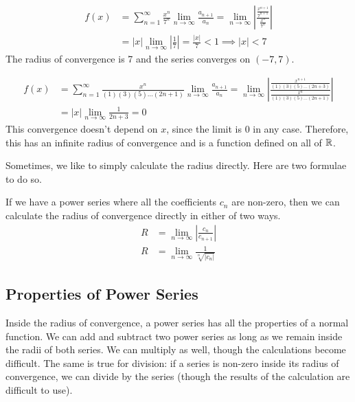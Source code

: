 \documentclass[fleqn,letterpaper]{report}
\begin{document}
\begin{example}
\begin{align*}
f(x) & = \sum_{n=1}^\infty \frac{x^n}{7^n} 
\lim_{n \rightarrow \infty} \frac{a_{n+1}}{a_n} = 
\lim_{n \rightarrow \infty} \left|
\frac{\frac{x^{n+1}}{7^{n+1}}}{\frac{x^n}{7^n}} \right| \\
& = |x| \lim_{n \rightarrow \infty} \left| \frac{1}{7} \right| =
\frac{|x|}{7} < 1 \implies |x| < 7 
\end{align*}
The radius of convergence is 7 and the series converges on
$(-7,7)$.
\end{example}

\begin{example}
\begin{align*}
f(x) & = \sum_{n=1}^\infty \frac{x^n}{(1)(3)(5) \ldots (2n+1)}
\lim_{n \rightarrow \infty} \frac{a_{n+1}}{a_n} = 
\lim_{n \rightarrow \infty} \left|
\frac{\frac{x^{n+1}}{(1)(3)(5) \ldots
(2n+3)}}{\frac{x^n}{(1)(3)(5)\ldots (2n+1)}} \right|\\
& = |x| \lim_{n \rightarrow \infty} \frac{1}{2n+3} = 0
\end{align*}
This convergence doesn't depend on $x$, since the limit is $0$
in any case. Therefore, this has an infinite radius of
convergence and is a function defined on all of $\mathbb{R}$.
\end{example}

Sometimes, we like to simply calculate the radius directly.
Here are two formulae to do so. 

\begin{prop}
If we have a power series where all the coefficients $c_n$ are
non-zero, then we can calculate the radius of convergence
directly in either of two ways.
\begin{align*}
R & = \lim_{n \rightarrow \infty} \left| \frac{c_n}{c_{n+1}}
\right| \\
R & = \lim_{n \rightarrow \infty} \frac{1}{\sqrt[n]{|c_n|}} 
\end{align*}
\end{prop}

\subsection{Properties of Power Series}
\label{power-series-properties}

Inside the radius of convergence, a power series has all the
properties of a normal function. We can add and subtract two
power series as long as we remain inside the radii of both
series. We can multiply as well, though the calculations
become difficult. The same is true for division: if a series
is non-zero inside its radius of convergence, we can divide
by the series (though the results of the calculation are difficult
to use).
\end{document}
